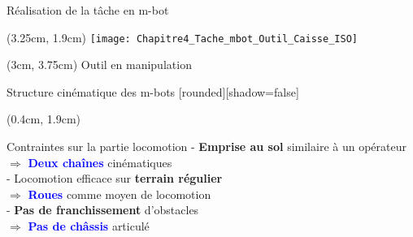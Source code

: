 \documentclass[french]{beamer}
\begin{document}
\begin{frame}{Réalisation de la tâche en m-bot}
{\begin{textblock*}{2cm}(3.25cm, 1.9cm)
\centering
\texttt{[image: Chapitre4\_Tache\_mbot\_Outil\_Caisse\_ISO]}
\end{textblock*}
\begin{textblock*}{2.5cm}(3cm, 3.75cm)
\centering
\tiny{Outil en manipulation}
\end{textblock*}
}

\end{frame}

\begin{frame}{Structure cinématique des m-bots}
[rounded][shadow=false]
{\small %
\begin{textblock*}{7cm}(0.4cm, 1.9cm)
\begin{block}{Contraintes sur la partie locomotion}
- \textbf{Emprise au sol} similaire à un opérateur \\ 
  \hspace{0.5cm}$\Rightarrow$ \textcolor{blue}{\textbf{Deux chaînes}} cinématiques \\

\vspace{0.25cm}
- Locomotion efficace sur \textbf{terrain régulier} \\ 
  \hspace{0.5cm}$\Rightarrow$ \textcolor{blue}{\textbf{Roues}} comme moyen de locomotion \\

\vspace{0.25cm}
- \textbf{Pas de franchissement} d'obstacles \\ 
  \hspace{0.5cm}$\Rightarrow$ \textcolor{blue}{\textbf{Pas de châssis}} articulé \\
\end{block}
\end{textblock*}

}



\end{frame}
\end{document}
